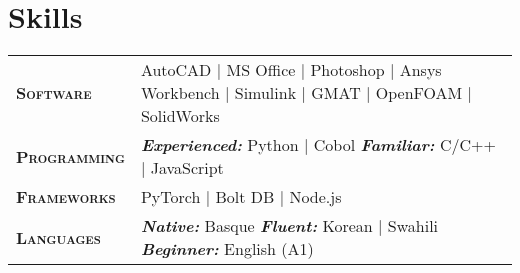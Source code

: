 \documentclass[a4paper,10pt]{article}
\makeatletter
\newcommand{\fillcell}{@{\extracolsep{\fill}}}		%
\makeatother
\begin{document}
\section{\textsf{Skills}}
\begin{tabular*}{\linewidth}{\fillcell l l \fillcell}
	\textbf{\scshape \textsf{Software}} &
	AutoCAD $|$ MS Office $|$ Photoshop $|$ Ansys Workbench $|$ Simulink $|$ GMAT $|$ OpenFOAM $|$ SolidWorks \\

	\textbf{\scshape \textsf{Programming}} &
	\emph{\textbf{Experienced:}} Python $|$ Cobol \quad
	\emph{\textbf{Familiar:}} C/C++ $|$ JavaScript \\

	\textbf{\scshape \textsf{Frameworks}} &
	PyTorch $|$ Bolt DB $|$ Node.js \\

	\textbf{\scshape \textsf{Languages}} &
	\emph{\textbf{Native:}} Basque \quad
	\emph{\textbf{Fluent:}} Korean $|$ Swahili \quad
	\emph{\textbf{Beginner:}} English (A1)
\end{tabular*}
\end{document}

